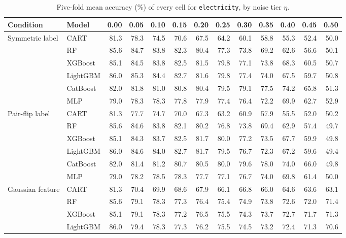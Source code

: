 \begin{table}[p]
\centering
\tiny
\setlength{\tabcolsep}{2.6pt}
\caption{Five-fold mean accuracy (\%) of every cell for \texttt{electricity}, by noise tier $\eta$.}
\label{tab:grid_electricity}
\begin{tabular}{@{}llrrrrrrrrrrr@{}}
\toprule
Condition & Model & 0.00 & 0.05 & 0.10 & 0.15 & 0.20 & 0.25 & 0.30 & 0.35 & 0.40 & 0.45 & 0.50 \\
\midrule
Symmetric label & CART & 81.3 & 78.3 & 74.5 & 70.6 & 67.5 & 64.2 & 60.1 & 58.8 & 55.3 & 52.4 & 50.0 \\
 & RF & 85.6 & 84.7 & 83.8 & 82.3 & 80.4 & 77.3 & 73.8 & 69.2 & 62.6 & 56.6 & 50.1 \\
 & XGBoost & 85.1 & 84.5 & 83.8 & 82.5 & 81.5 & 79.8 & 77.1 & 73.8 & 68.3 & 60.5 & 50.7 \\
 & LightGBM & 86.0 & 85.3 & 84.4 & 82.7 & 81.6 & 79.8 & 77.4 & 74.0 & 67.5 & 59.7 & 50.8 \\
 & CatBoost & 82.0 & 81.8 & 81.0 & 80.8 & 80.4 & 79.5 & 79.1 & 77.5 & 74.2 & 65.8 & 51.3 \\
 & MLP & 79.0 & 78.3 & 78.3 & 77.8 & 77.9 & 77.4 & 76.4 & 72.2 & 69.9 & 62.7 & 52.9 \\
\midrule
Pair-flip label & CART & 81.3 & 77.7 & 74.7 & 70.0 & 67.3 & 63.2 & 60.9 & 57.9 & 55.5 & 52.0 & 50.2 \\
 & RF & 85.6 & 84.6 & 83.8 & 82.1 & 80.2 & 76.8 & 73.8 & 69.4 & 62.9 & 57.4 & 49.7 \\
 & XGBoost & 85.1 & 84.3 & 83.7 & 82.5 & 81.7 & 80.0 & 77.2 & 73.5 & 67.7 & 59.9 & 49.8 \\
 & LightGBM & 86.0 & 84.6 & 84.0 & 82.7 & 81.7 & 79.5 & 76.7 & 72.3 & 67.2 & 59.6 & 49.4 \\
 & CatBoost & 82.0 & 81.4 & 81.2 & 80.7 & 80.5 & 80.0 & 79.6 & 78.0 & 74.0 & 66.0 & 49.8 \\
 & MLP & 79.0 & 78.2 & 78.5 & 78.3 & 77.7 & 77.1 & 76.7 & 74.0 & 69.8 & 61.4 & 50.0 \\
\midrule
Gaussian feature & CART & 81.3 & 70.4 & 69.9 & 68.6 & 67.9 & 66.1 & 66.8 & 66.0 & 64.6 & 63.6 & 63.1 \\
 & RF & 85.6 & 79.1 & 78.3 & 77.3 & 76.4 & 75.4 & 74.9 & 73.8 & 72.6 & 72.0 & 71.4 \\
 & XGBoost & 85.1 & 79.1 & 78.3 & 77.2 & 76.5 & 75.5 & 74.3 & 73.7 & 72.7 & 71.7 & 71.3 \\
 & LightGBM & 86.0 & 79.4 & 78.3 & 77.3 & 76.2 & 75.5 & 74.5 & 73.2 & 72.4 & 71.3 & 70.6 \\

\end{tabular}
\end{table}
